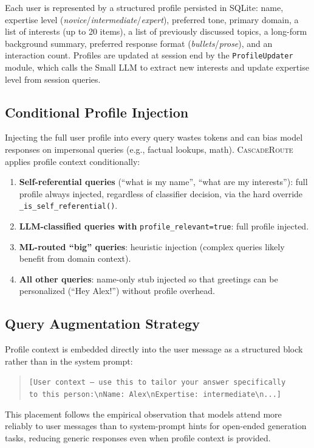\documentclass{article}
\newcommand{\system}{\textsc{CascadeRoute}}
\begin{document}
Each user is represented by a structured profile persisted in SQLite:
name, expertise level (\emph{novice}/\emph{intermediate}/\emph{expert}),
preferred tone, primary domain, a list of interests (up to 20 items),
a list of previously discussed topics, a long-form background summary,
preferred response format (\emph{bullets}/\emph{prose}), and an
interaction count. Profiles are updated at session end by the
\texttt{ProfileUpdater} module, which calls the Small LLM to extract
new interests and update expertise level from session queries.

\subsection{Conditional Profile Injection}
\label{sec:injection}

Injecting the full user profile into every query wastes tokens and can
bias model responses on impersonal queries (e.g., factual lookups,
math). \system{} applies profile context conditionally:

\begin{enumerate}
    \item \textbf{Self-referential queries} (``what is my name'',
          ``what are my interests''): full profile always injected,
          regardless of classifier decision, via the hard override
          \texttt{\_is\_self\_referential()}.
    \item \textbf{LLM-classified queries with} \texttt{profile\_relevant=true}:
          full profile injected.
    \item \textbf{ML-routed ``big'' queries}: heuristic injection
          (complex queries likely benefit from domain context).
    \item \textbf{All other queries}: name-only stub injected so that
          greetings can be personalized (``Hey Alex!'') without profile
          overhead.
\end{enumerate}

\subsection{Query Augmentation Strategy}
\label{sec:augmentation}

Profile context is embedded directly into the user message as a structured
block rather than in the system prompt:
\begin{quote}
\texttt{[User context --- use this to tailor your answer specifically\\
to this person:\textbackslash{}nName: Alex\textbackslash{}nExpertise:
intermediate\textbackslash{}n...]}
\end{quote}
This placement follows the empirical observation that models attend more
reliably to user messages than to system-prompt hints for open-ended
generation tasks, reducing generic responses even when profile context
is provided.
\end{document}
